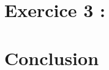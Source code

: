 \documentclass[a4paper, 10pt]{article}
\begin{document}
\subsection*{}
\subsection*{}
\subsection*{}

\section*{Exercice 3 : }

\subsection*{}
\subsection*{}
\subsection*{}

\section*{Conclusion}
\end{document}
